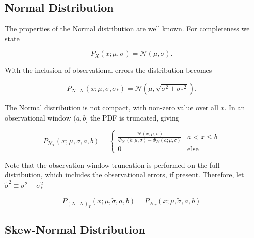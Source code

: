 \documentclass[twocolumn]{aastex631}
\newcommand{\mcal}[1]{\mathcal{#1}}
\newcommand{\sigobs}{{\sigma_*}}
\begin{document}
    \subsection{Normal Distribution} \label{app:sub:normal_distribution}

        The properties of the Normal distribution are well known. For
        completeness we state

        \begin{equation}
            P_X(x; \mu, \sigma) = \mcal{N}(\mu, \sigma).
        \end{equation}

        With the inclusion of observational errors the distribution becomes

        \begin{equation}
            P_{\mcal{N}\cdot\mcal{N}}(x; \mu, \sigma, \sigobs) = \mcal{N}(\mu, \sqrt{\sigma^2 + \sigobs^2}).
        \end{equation}

        The Normal distribution is not compact, with non-zero value over all
        $x$. In an observational window $(a,b]$ the PDF is truncated, giving

        \begin{equation}
            P_{\mcal{N}_T}(x; \mu, \sigma, a, b) = \begin{cases}
                \frac{\mcal{N}(x, \mu, \sigma)}{\Phi_\mcal{N}(b; \mu, \sigma) - \Phi_\mcal{N}(a; \mu, \sigma)} & a < x \leq b \\
                0 & \text{else}
            \end{cases}
        \end{equation}

        Note that the observation-window-truncation is performed on the full
        distribution, which includes the observational errors, if present.
        Therefore, let $\tilde{\sigma}^2 \equiv \sigma^2+\sigma_*^2$

        \begin{equation}
            P_{(\mcal{N}\cdot\mcal{N})_T}(x; \mu, \tilde{\sigma}, a, b) = P_{\mcal{N}_T}(x; \mu, \tilde{\sigma}, a, b)
        \end{equation}

    \vspace{10pt}
    \subsection{Skew-Normal Distribution}
\end{document}
